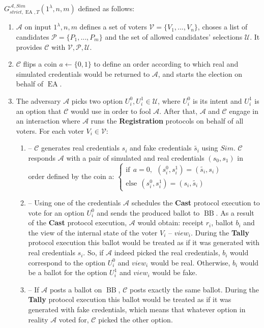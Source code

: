\documentclass[12pt]{article}
\DeclareMathOperator{\ea}{EA}
\DeclareMathOperator{\bb}{BB}
\begin{document}
$G_{strict,\ea,T}^{\mathcal{A}, Sim}(1^{\lambda},n,m)$ defined as follows:\\
\begin{enumerate}
\item $\mathcal{A}$ on input $1^{\lambda},n,m$ defines a set of voters  $\mathcal{V} = \{V_1,...,V_n\}$, choses a list of candidates  $\mathcal{P} = \{P_1,...,P_m\}$ and the set of allowed candidates' selections $\mathcal{U}$.  It provides $\mathcal{C}$ with $\mathcal{V}, \mathcal{P}, \mathcal{U}$.
\item $\mathcal{C}$ flips a coin $a \leftarrow \{0,1\}$ to define an order according to which real and simulated credentials would be returned to $\mathcal{A}$, and starts the election on behalf of $\ea$. 
\item The adversary $\mathcal{A}$ picks two option $U^0_i,U^1_i \in \mathcal{U}$, where $U^0_i$ is its intent and $U^1_i$ is an option that $\mathcal{C}$ would use in order to fool $\mathcal{A}$. After that, $\mathcal{A}$  and $\mathcal{C}$ engage in an interaction where $\mathcal{A}$ runs the \textbf{Registration} protocols on behalf of all voters. For each voter $V_i \in \mathcal{V}$:
\begin{enumerate}
\item[] --  $\mathcal{C}$ generates real credentials $s_i$  and fake credentials $\tilde{s_i}$ using $Sim$.  $\mathcal{C}$  responds  $\mathcal{A}$ with a pair of simulated and real credentials $(s_0,s_1)$ in order defined by the coin a:
$ \begin{cases}
 \text{if} ~~a =0,~~ (s^0_i,s^1_i) = (\tilde{s_i},s_i)  \\ 
 \text{else}~~  (s^0_i,s^1_i) = (s_i,\tilde{s_i})
\end{cases}$
\item[] -- Using one of the credentials $\mathcal{A}$ schedules the \textbf{Cast} protocol execution to vote for an option $U^0_i$ and sends the produced ballot to $\bb$. As a result of the \textbf{Cast} protocol execution, $\mathcal{A}$ would obtain: receipt $r_i$, ballot $b_i$ and the view of the internal state of the voter $V_i$ -- $view_i$.  During the \textbf{Tally} protocol execution this ballot would be treated as if it was generated with real credentials $s_i$. So, if  $\mathcal{A}$ indeed picked the real credentials, $b_i$ would correspond to the option   $U^0_i$  and $view_i$ would be real. Otherwise, $b_i$ would be a ballot for the option  $U^1_i$ and $view_i$ would be fake. 
\item[] --  If  $\mathcal{A}$ posts a ballot on $\bb$, $\mathcal{C}$ posts exactly the same ballot. During the \textbf{Tally} protocol execution this ballot would be treated as if it was generated with fake credentials, which means that whatever option in reality $\mathcal{A}$ voted for, $\mathcal{C}$ picked the other option.  

\end{enumerate}
\end{enumerate}
\end{document}
